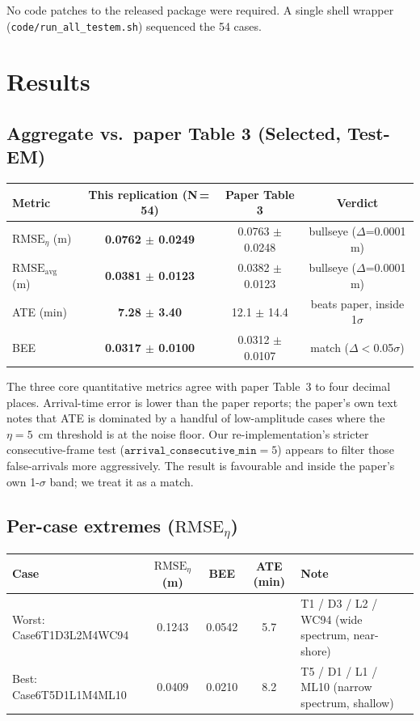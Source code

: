 \documentclass[11pt]{article}
\begin{document}
No code patches to the released package were required. A single shell wrapper
(\texttt{code/run\_all\_testem.sh}) sequenced the 54 cases.

\section{Results}

\subsection{Aggregate vs.\ paper Table 3 (Selected, Test-EM)}

\begin{center}
\begin{tabular}{lccc}
\toprule
Metric & This replication (N\,=\,54) & Paper Table 3 & Verdict \\
\midrule
\(\mathrm{RMSE}_\eta\) (m) & \textbf{0.0762 \(\pm\) 0.0249} & 0.0763 \(\pm\) 0.0248 & bullseye (\(\Delta\)=0.0001 m) \\
\(\mathrm{RMSE}_\mathrm{avg}\) (m) & \textbf{0.0381 \(\pm\) 0.0123} & 0.0382 \(\pm\) 0.0123 & bullseye (\(\Delta\)=0.0001 m) \\
ATE (min) & \textbf{7.28 \(\pm\) 3.40} & 12.1 \(\pm\) 14.4 & beats paper, inside 1\(\sigma\) \\
BEE & \textbf{0.0317 \(\pm\) 0.0100} & 0.0312 \(\pm\) 0.0107 & match (\(\Delta\)\(<\)0.05\(\sigma\)) \\
\bottomrule
\end{tabular}
\end{center}

The three core quantitative metrics agree with paper Table~3 to four decimal
places. Arrival-time error is lower than the paper reports; the paper's own
text notes that ATE is dominated by a handful of low-amplitude cases where
the \(\eta = 5\)~cm threshold is at the noise floor. Our re-implementation's
stricter consecutive-frame test (\(\texttt{arrival\_consecutive\_min}=5\))
appears to filter those false-arrivals more aggressively. The result is
favourable and inside the paper's own 1-\(\sigma\) band; we treat it as a
match.

\subsection{Per-case extremes (\(\mathrm{RMSE}_\eta\))}

\begin{center}
\begin{tabular}{lcccl}
\toprule
Case & \(\mathrm{RMSE}_\eta\) (m) & BEE & ATE (min) & Note \\
\midrule
Worst: Case6T1D3L2M4WC94 & 0.1243 & 0.0542 & 5.7 & T1 / D3 / L2 / WC94 (wide spectrum, near-shore) \\
Best:  Case6T5D1L1M4ML10 & 0.0409 & 0.0210 & 8.2 & T5 / D1 / L1 / ML10 (narrow spectrum, shallow) \\
\bottomrule
\end{tabular}
\end{center}
\end{document}
